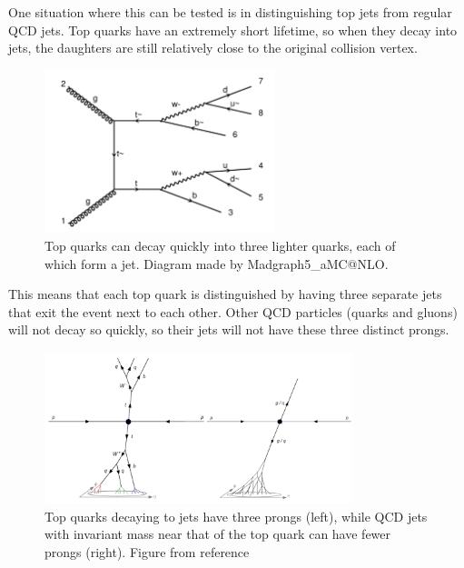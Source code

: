\documentclass[a4paper,12pt]{report}
\begin{document}
One situation where this can be tested is in distinguishing top jets from regular QCD jets. Top quarks have an extremely short lifetime, so when they decay into jets, the daughters are still relatively close to the original collision vertex. 

\begin{figure}[!htbp]
 \centering
 \includegraphics[width=0.6\textwidth]{ttbar.pdf}
 \caption{\label{fig:ttbar} Top quarks can decay quickly into three lighter quarks, each of which form a jet. Diagram made by Madgraph5\_aMC@NLO.}
\end{figure}

This means that each top quark is distinguished by having three separate jets that exit the event next to each other. Other QCD particles (quarks and gluons) will not decay so quickly, so their jets will not have these three distinct prongs.

\begin{figure}[!htbp]
 \centering
 \includegraphics[width=0.8\textwidth]{jets.pdf}
 \caption{\label{fig:subjets} Top quarks decaying to jets have three prongs (left), while QCD jets with invariant mass near that of the top quark can have fewer prongs (right). Figure from reference \cite{Thaler:2010} }
\end{figure}
\end{document}
